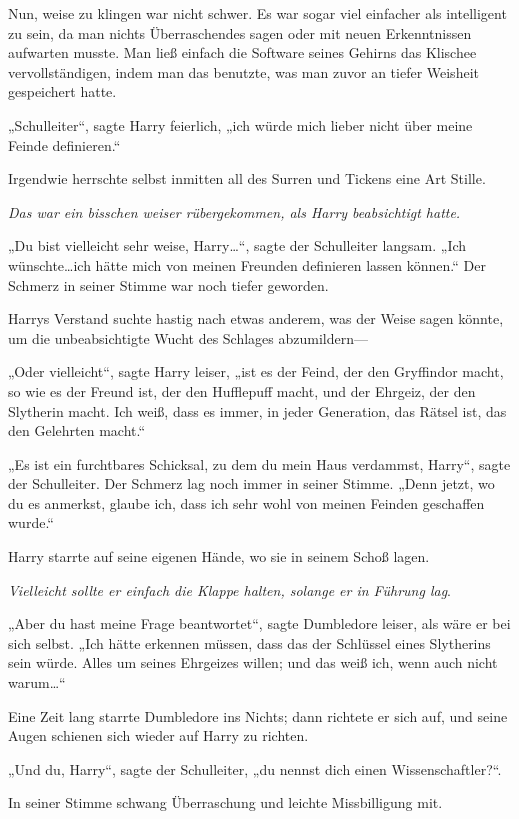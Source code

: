 {Nun, weise zu klingen war nicht schwer. Es war sogar viel einfacher als intelligent zu sein, da man nichts Überraschendes sagen oder mit neuen Erkenntnissen aufwarten musste. Man ließ einfach die Software seines Gehirns das Klischee vervollständigen, indem man das benutzte, was man zuvor an tiefer Weisheit gespeichert hatte.

„Schulleiter“, sagte Harry feierlich, „ich würde mich lieber nicht über meine Feinde definieren.“

Irgendwie herrschte selbst inmitten all des Surren und Tickens eine Art Stille.

\emph{Das war ein bisschen weiser rübergekommen, als Harry beabsichtigt hatte.}

„Du bist vielleicht sehr weise, Harry…“, sagte der Schulleiter langsam. „Ich wünschte…ich hätte mich von meinen Freunden definieren lassen können.“ Der Schmerz in seiner Stimme war noch tiefer geworden.

Harrys Verstand suchte hastig nach etwas anderem, was der Weise sagen könnte, um die unbeabsichtigte Wucht des Schlages abzumildern—

„Oder vielleicht“, sagte Harry leiser, „ist es der Feind, der den Gryffindor macht, so wie es der Freund ist, der den Hufflepuff macht, und der Ehrgeiz, der den Slytherin macht. Ich weiß, dass es immer, in jeder Generation, das Rätsel ist, das den Gelehrten macht.“

„Es ist ein furchtbares Schicksal, zu dem du mein Haus verdammst, Harry“, sagte der Schulleiter. Der Schmerz lag noch immer in seiner Stimme. „Denn jetzt, wo du es anmerkst, glaube ich, dass ich sehr wohl von meinen Feinden geschaffen wurde.“

Harry starrte auf seine eigenen Hände, wo sie in seinem Schoß lagen.

\emph{Vielleicht sollte er einfach die Klappe halten, solange er in Führung lag}.

„Aber du hast meine Frage beantwortet“, sagte Dumbledore leiser, als wäre er bei sich selbst. „Ich hätte erkennen müssen, dass das der Schlüssel eines Slytherins sein würde. Alles um seines Ehrgeizes willen; und das weiß ich, wenn auch nicht warum…“

Eine Zeit lang starrte Dumbledore ins Nichts; dann richtete er sich auf, und seine Augen schienen sich wieder auf Harry zu richten.

„Und du, Harry“, sagte der Schulleiter, „du nennst dich einen Wissenschaftler?“.

In seiner Stimme schwang Überraschung und leichte Missbilligung mit.

}

